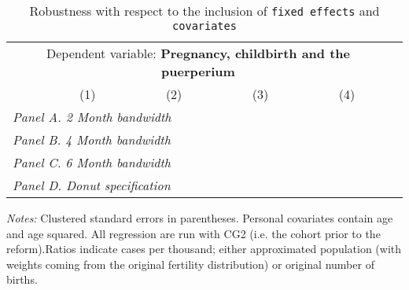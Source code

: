  \begin{table}[H] \begin{threeparttable} \centering \caption{Robustness with respect to the inclusion of \texttt{fixed effects} and \texttt{covariates}} {\def\sym#1{\ifmmode^{#1}\else\(^{#1}\)\fi} \begin{tabular}{l*{5}{c}} \toprule \multicolumn{5}{c}{Dependent variable: \textbf{Pregnancy, childbirth and the puerperium}} \\ \cmidrule(lr){2-5}
            &\multicolumn{1}{c}{(1)}&\multicolumn{1}{c}{(2)}&\multicolumn{1}{c}{(3)}&\multicolumn{1}{c}{(4)}\\
\midrule
 \multicolumn{5}{l}{\emph{Panel A. 2 Month bandwidth}} \\    \midrule\multicolumn{5}{l}{\emph{Panel B. 4 Month bandwidth}} \\    \midrule\multicolumn{5}{l}{\emph{Panel C. 6 Month bandwidth}} \\    \midrule\multicolumn{5}{l}{\emph{Panel D. Donut specification}} \\    \midrule  
\bottomrule \end{tabular} } \begin{tablenotes} \item \scriptsize \emph{Notes:} Clustered standard errors in parentheses. Personal covariates contain age and age squared. All regression are run with CG2 (i.e. the cohort prior to the reform).Ratios indicate cases per thousand; either approximated population (with weights coming from the original fertility distribution) or original number of births. \end{tablenotes} \end{threeparttable} \end{table} 
